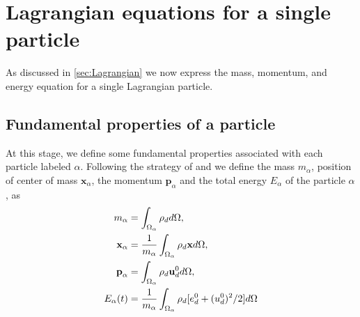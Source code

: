 \section{Lagrangian equations for a single particle}
\label{ap:particles_eq}

As discussed in \ref{sec:Lagrangian} we now express the mass, momentum, and energy equation for a single Lagrangian particle. 

\subsection{Fundamental properties of a particle}

At this stage, we define some fundamental properties associated with each particle labeled $\alpha$.
Following the strategy of \citet{lhuillier2009rheology,lhuillier1992volume,zaepffel2011modelisation} and \citet[Chapter 2]{morel2015mathematical}
we define the mass $m_\alpha$, position of center of mass $\mathbf{x}_\alpha$, the momentum $\textbf{p}_\alpha$ and the total energy $E_\alpha$ of the particle $\alpha$, as
\begin{align}
    m_\alpha
    &= \intO{ \rho_d  }, 
    \\
    \textbf{x}_\alpha
    &= \frac{1}{m_\alpha }\intO{ \rho_d \textbf{x} }, 
    \\\textbf{p}_\alpha 
    &= \intO{ \rho_d \textbf{u}_d^0 },
    \label{eq:mass_pos}
    \\
    E_\alpha(t) 
    &=\frac{1}{m_\alpha} 
    \intO{ \rho_d [e_d^0 + (u_d^0)^2/2] }
\end{align}
